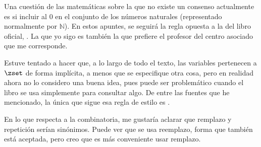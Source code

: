 



Una cuestión de las matemáticas sobre la que no existe un consenso
actualmente es si incluir al 0 en el conjunto de los números naturales
(representado normalmente por $\mathbb{N}$). En estos apuntes, se seguirá la
regla opuesta a la del libro oficial, \cite{texto-uned}. La que yo sigo es
también la que prefiere el profesor del centro asociado que me corresponde.

Estuve tentado a hacer que, a lo largo de todo el texto, las variables
pertenecen a $\zset$ de forma implícita, a menos que se especifique otra
cosa, pero en realidad ahora no lo considero una buena idea, pues puede ser
problemático cuando el libro se usa simplemente para consultar algo. De
entre las fuentes que he mencionado, la única que sigue esa regla de estilo
es \cite{leighton}.







En lo que respecta a la combinatoria, me gustaría aclarar que remplazo y
repetición serían sinónimos. Puede ver que se usa reemplazo, forma que
también está aceptada, pero creo que es más conveniente usar remplazo.











